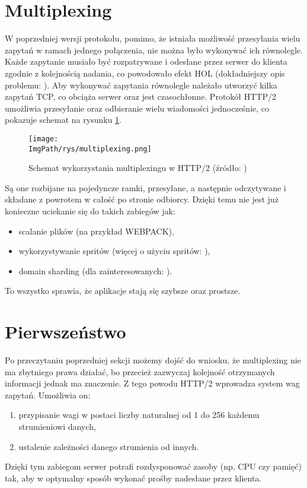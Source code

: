 \documentclass[a4paper,12pt,twoside,openany]{report}
\newcommand{\ImgPath}{.}
\begin{document}
\section{Multiplexing}
\label{sectionMultiplexing}
W poprzedniej wersji protokołu, pomimo, że istniała możliwość przesyłania wielu zapytań w ramach jednego połączenia, nie można było wykonywać ich równolegle.
Każde zapytanie musiało być rozpatrywane i odesłane przez serwer do klienta zgodnie z kolejnością nadania, co powodowało efekt HOL (dokładniejszy opis problemu: \cite{hol}).
Aby wykonywać zapytania równolegle należało utworzyć kilka zapytań TCP, co obciąża serwer oraz jest czasochłonne.
Protokół HTTP/2 umożliwia przesyłanie oraz odbieranie wielu wiadomości jednocześnie, co pokazuje schemat na rysunku \ref{schematMultiplexing}.
\begin{figure}[!htbp]
	\begin{center}
\centering
\texttt{[image: \\ImgPath/rys/multiplexing.png]}
\end{center}
	\caption{Schemat wykorzystania multiplexingu w HTTP/2 (źródło: \cite{http2Fundamentals})}
	\label{schematMultiplexing}
\end{figure}
Są one rozbijane na pojedyncze ramki, przesyłane, a następnie odczytywane i składane z powrotem w całość po stronie odbiorcy.
Dzięki temu nie jest już konieczne uciekanie się do takich zabiegów jak:
\begin{itemize}
	\item scalanie plików (na przykład WEBPACK),
	\item  wykorzystywanie spritów (więcej o użyciu spritów: \cite{sprites}),
	\item domain sharding (dla zainteresowanych: \cite{domainSharding}).
\end{itemize}
To wszystko sprawia, że aplikacje stają się szybsze oraz prostsze.

\section{Pierwszeństwo}

Po przeczytaniu poprzedniej sekcji możemy dojść do wniosku, że multiplexing nie ma zbytniego prawa działać, bo przecież zazwyczaj kolejność otrzymanych informacji jednak ma znaczenie.
Z tego powodu HTTP/2 wprowadza system wag zapytań.
Umożliwia on:
\begin{enumerate}
	\item przypisanie wagi w postaci liczby naturalnej od 1 do 256 każdemu strumieniowi danych,
	\item ustalenie zależności danego strumienia od innych.
\end{enumerate}
Dzięki tym zabiegom serwer potrafi rozdysponować zasoby (np. CPU czy pamięć) tak, aby w optymalny sposób wykonać prośby nadesłane przez klienta.
\end{document}
